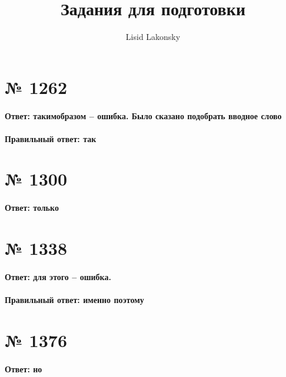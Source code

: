 \documentclass[11pt]{article} %
\title{Задания для подготовки}
\author{Lisid Lakonsky}
\begin{document}
\maketitle

\section{№ \textbf{1262}}

\paragraph{Ответ: такимобразом -- ошибка. Было сказано подобрать вводное слово}

\paragraph{Правильный ответ: \textbf{так}}

\section{№ \textbf{1300}}

\paragraph{Ответ: \textbf{только}}

\section{№ \textbf{1338}}

\paragraph{Ответ: для этого -- ошибка.}

\paragraph{Правильный ответ: \textbf{именно поэтому}}

\section{№ \textbf{1376}}

\paragraph{Ответ: \textbf{но}}
\end{document}
